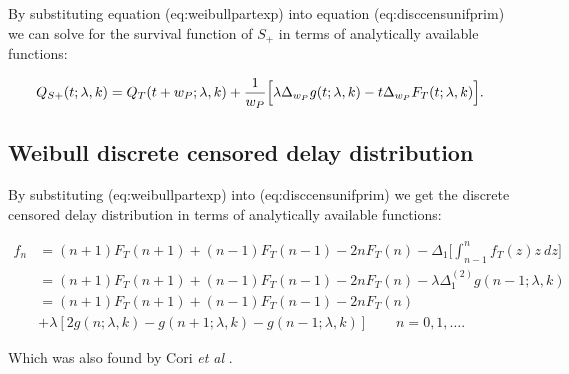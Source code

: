 \documentclass[10pt,letterpaper]{article}
\begin{document}
By substituting equation \@ref(eq:weibullpartexp) into equation \@ref(eq:disccensunifprim) we can solve for the survival function of $S_+$ in terms of analytically available functions:

\begin{equation}
Q_{S+}(t ;\lambda,k) = Q_T(t + w_P; \lambda,k) + { 1 \over w_P} \Big[ \lambda \Delta_{w_P} g(t; \lambda,k) - t\Delta_{w_P}F_T(t; \lambda,k)\Big].
\end{equation}

\subsection{Weibull discrete censored delay distribution}

By substituting \@ref(eq:weibullpartexp) into \@ref(eq:disccensunifprim) we get the discrete censored delay distribution in terms of analytically available functions:

\begin{equation}
\begin{aligned}
f_n &= (n+1)F_T(n+1)  + (n-1)F_T(n-1) - 2nF_T(n) - \Delta_1\Big[ \int_{n-1}^n f_T(z) z ~dz \Big] \\
&= (n+1)F_T(n+1)  + (n-1)F_T(n-1) - 2nF_T(n) - \lambda \Delta_1^{(2)} g(n-1; \lambda,k) \\
&= (n+1)F_T(n+1)  + (n-1)F_T(n-1) - 2nF_T(n) \\
&+ \lambda [2 g(n; \lambda,k) - g(n+1; \lambda,k) - g(n-1; \lambda,k)] \qquad n = 0, 1, \dots.
\end{aligned}
\end{equation}

Which was also found by Cori \textit{et al} \cite{Cori2013}.
\end{document}
